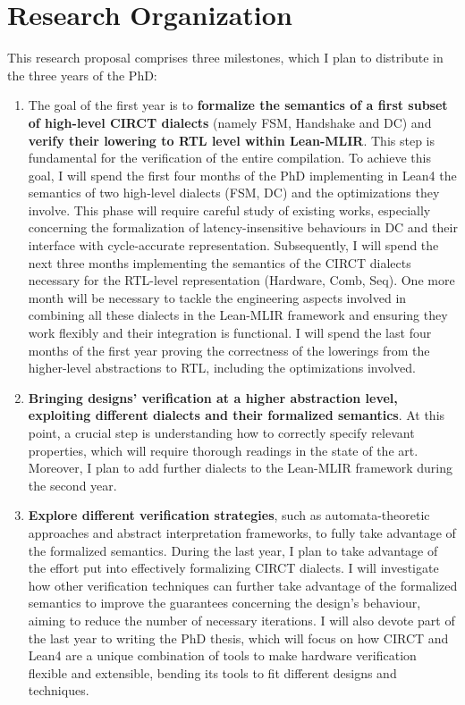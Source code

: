 \documentclass[sigconf,authorversion,nonacm, 11pt]{acmart}
\begin{document}
\section{Research Organization}

This research proposal comprises three milestones, which I plan to distribute in the three years of the PhD: 
\begin{enumerate}
    \item The goal of the first year is to \textbf{formalize the semantics of a first subset of high-level CIRCT dialects} (namely FSM, Handshake and DC) 
 and \textbf{verify their lowering to RTL level within Lean-MLIR}. This step is fundamental for the verification of the entire compilation. 
 To achieve this goal, I will spend the first four months of the PhD implementing in Lean4 the semantics of two high-level dialects (FSM, DC) and 
 the optimizations they involve. This phase will require careful study of existing works, especially concerning the formalization of latency-insensitive 
 behaviours in DC and their interface with cycle-accurate representation. 
 Subsequently, I will spend the next three months implementing the semantics of the CIRCT dialects necessary for the RTL-level representation (Hardware, Comb, Seq). 
 One more month will be necessary to tackle the engineering aspects involved in combining all these dialects in the Lean-MLIR framework and ensuring they work 
 flexibly and their integration is functional. I will spend the last four months of the first year proving the correctness of the lowerings from the higher-level 
 abstractions to RTL, including the optimizations involved. 
    \item \textbf{Bringing designs’ verification at a higher abstraction level, exploiting different dialects and their formalized semantics}. 
 At this point, a crucial step is understanding how to correctly specify relevant properties, which will require thorough readings in the state of the art. 
 Moreover, I plan to add further dialects to the Lean-MLIR framework during the second year. 
    \item \textbf{Explore different verification strategies}, such as automata-theoretic approaches and abstract interpretation frameworks, 
 to fully take advantage of the formalized semantics. During the last year, I plan to take advantage of the effort put into effectively formalizing CIRCT dialects. 
 I will investigate how other verification techniques can further take advantage of the formalized semantics to improve the 
 guarantees concerning the design’s behaviour, aiming to reduce the number of necessary iterations. 
 I will also devote part of the last year to writing the PhD thesis, which will focus on how CIRCT and Lean4 are 
 a unique combination of tools to make hardware verification flexible and extensible, bending its tools to fit 
 different designs and techniques.
\end{enumerate}

\thispagestyle{empty}


\thispagestyle{empty}
\end{document}
